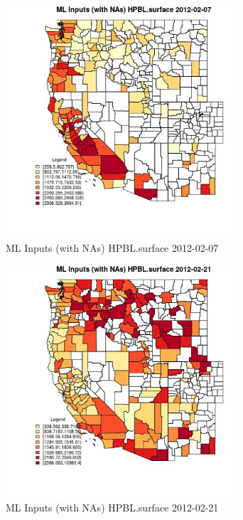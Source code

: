 \begin{figure} 
\centering  
\includegraphics[width=0.77\textwidth]{Code_Outputs/Report_ML_input_PM25_Step4_part_f_de_duplicated_aves_prioritize_24hr_obswNAs_CountyHPBLsurfaceMean2012-02-07.jpg} 
\caption{\label{fig:Report_ML_input_PM25_Step4_part_f_de_duplicated_aves_prioritize_24hr_obswNAsCountyHPBLsurfaceMean2012-02-07}ML Inputs (with NAs) HPBL.surface 2012-02-07} 
\end{figure} 
 

\begin{figure} 
\centering  
\includegraphics[width=0.77\textwidth]{Code_Outputs/Report_ML_input_PM25_Step4_part_f_de_duplicated_aves_prioritize_24hr_obswNAs_CountyHPBLsurfaceMean2012-02-21.jpg} 
\caption{\label{fig:Report_ML_input_PM25_Step4_part_f_de_duplicated_aves_prioritize_24hr_obswNAsCountyHPBLsurfaceMean2012-02-21}ML Inputs (with NAs) HPBL.surface 2012-02-21} 
\end{figure} 
 


